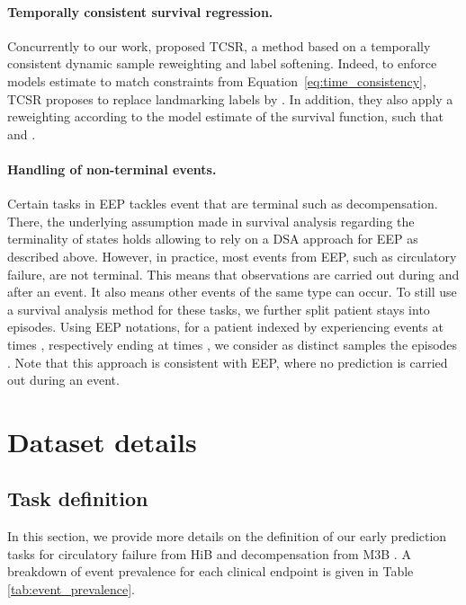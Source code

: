 \documentclass[nohyperref]{article}
\begin{document}
\paragraph{Temporally consistent survival regression.} Concurrently to our work, \citet{Maystre2022} proposed TCSR, a method based on a temporally consistent dynamic sample reweighting  and label softening. Indeed, to enforce models estimate to match constraints from Equation~\ref{eq:time_consistency}, TCSR proposes to replace landmarking labels  by . In addition, they also apply a reweighting according to the model estimate of the survival function, such that  and . 

\paragraph{Handling of non-terminal events.} Certain tasks in EEP tackles event that are terminal such as decompensation. There, the underlying assumption made in survival analysis regarding the terminality of states holds allowing to rely on a DSA approach for EEP as described above. However, in practice, most events from EEP, such as circulatory failure, are not terminal. This means that observations are carried out during and after an event. It also means other events of the same type can occur. To still use a survival analysis method for these tasks, we further split patient stays into episodes.
Using EEP notations, for a patient indexed by  experiencing  events at times , respectively ending at times , we consider as distinct samples the episodes . Note that this approach is consistent with EEP, where no prediction is carried out during an event. 


\section{Dataset details}
\label{appendix:dataset_details}
\subsection{Task definition}
\label{appendix:task definition}

In this section, we provide more details on the definition of our early prediction tasks for {circulatory failure} from HiB \citep{yeche2021} and {decompensation} from M3B \citep{harutyunyan2019multitask}. A breakdown of event prevalence for each clinical endpoint is given in Table \ref{tab:event_prevalence}.
\end{document}
